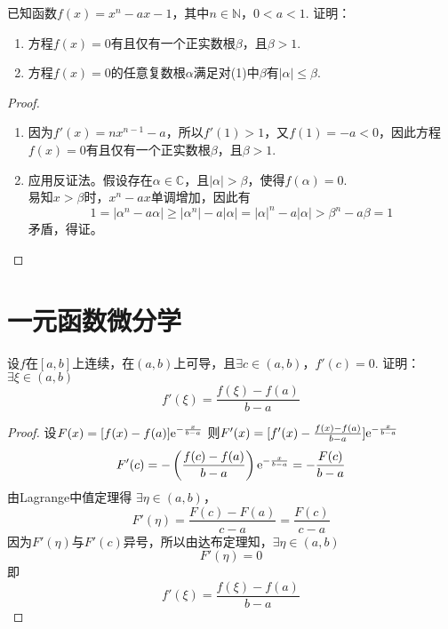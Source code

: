 \begin{proposition}

    已知函数$f(x) = x^n - ax - 1$，其中$n \in \mathbb{N}$，$0 < a < 1$. 证明：

    \begin{enumerate}

        \item 方程$f(x) = 0$有且仅有一个正实数根$\beta$，且$\beta > 1$.
        
        \item 方程$f(x) = 0$的任意复数根$\alpha$满足对(1)中$\beta$有$|\alpha| \leq \beta$.
        
    \end{enumerate}

\end{proposition}

\begin{proof}

    \begin{enumerate}

        \item 因为$f'(x) = nx^{n - 1} - a$，所以$f'(1) > 1$，又$f(1) = -a < 0$，因此方程$f(x) = 0$有且仅有一个正实数根$\beta$，且$\beta > 1$.
        
        \item 
            应用反证法。假设存在$\alpha \in \mathbb{C}$，且$|\alpha| > \beta$，使得$f(\alpha) = 0$. \\
            易知$x > \beta$时，$x^n - ax$单调增加，因此有
            \[1 = |\alpha^n - a\alpha| \geq |\alpha^n| - a|\alpha| = |\alpha|^n - a|\alpha| > \beta^n - a\beta = 1\]
            矛盾，得证。

    \end{enumerate}

\end{proof}

\section{一元函数微分学}

\begin{proposition}
    
    设$f$在$[a, b]$上连续，在$(a, b)$上可导，且$\exists c \in (a, b)$，$f'(c) = 0$.
    证明：$\exists \xi \in (a, b)$
    \[f'(\xi) = \dfrac{f(\xi) - f(a)}{b - a}\]

\end{proposition}

\begin{proof}
    
    设$F(x) = [f(x) - f(a)]\mathrm{e}^{-\frac{x}{b - a}}$
    则$F'(x) = [f'(x) - \frac{f(x) - f(a)}{b - a}]\mathrm{e}^{-\frac{x}{b - a}}$
    \[F'(c) = -\left( \dfrac{f(c) - f(a)}{b - a} \right)\mathrm{e}^{-\frac{x}{b - a}} = -\dfrac{F(c)}{b - a}\]
    由\textup{Lagrange}中值定理得
    $\exists \eta \in (a, b)$，
    \[F'(\eta) = \dfrac{F(c) - F(a)}{c - a} = \dfrac{F(c)}{c - a}\]
    因为$F'(\eta)$与$F'(c)$异号，所以由达布定理知，$\exists \eta \in (a, b)$
    \[F'(\eta) = 0\]
    即
    \[f'(\xi) = \dfrac{f(\xi) - f(a)}{b - a}\]

\end{proof}

